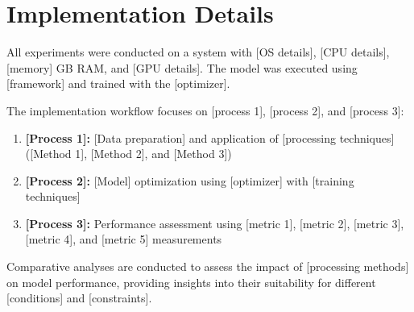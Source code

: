 \section{Implementation Details}

All experiments were conducted on a system with [OS details], [CPU details], [memory] GB RAM, and [GPU details]. The model was executed using [framework] and trained with the [optimizer].

The implementation workflow focuses on [process 1], [process 2], and [process 3]:

\begin{enumerate}
\item \textbf{[Process 1]:} [Data preparation] and application of [processing techniques] ([Method 1], [Method 2], and [Method 3])
\item \textbf{[Process 2]:} [Model] optimization using [optimizer] with [training techniques]
\item \textbf{[Process 3]:} Performance assessment using [metric 1], [metric 2], [metric 3], [metric 4], and [metric 5] measurements
\end{enumerate}

Comparative analyses are conducted to assess the impact of [processing methods] on model performance, providing insights into their suitability for different [conditions] and [constraints].